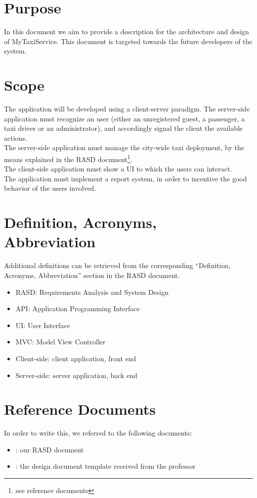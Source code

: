\section{Purpose}
In this document we aim to provide a description for the architecture and design of MyTaxiService.
This document is targeted towards the future developers of the system.

\section{Scope}
The application will be developed using a client-server paradigm.
The server-side application must recognize an user (either an unregistered guest, a passenger, a taxi driver or an administrator), 
and accordingly signal the client the available actions. \\
The server-side application must manage the city-wide taxi deployment, by the means explained in the RASD 
document\footnote{see reference documents}. \\ The client-side application must show a UI to which the users can interact. \\
The application must implement a report system, in order to incentive the good behavior of the users involved.

\section{Definition, Acronyms, Abbreviation}
Additional definitions can be retrieved from the corresponding ``Definition, Acronyms, Abbreviation'' section in the RASD document.
\begin{itemize}
 \item RASD: Requirements Analysis and System Design
 \item API: Application Programming Interface
 \item UI: User Interface
 \item MVC: Model View Controller
 \item Client-side: client application, front end
 \item Server-side: server application, back end
\end{itemize}

\section{Reference Documents}
In order to write this, we referred to the following documents:
\begin{itemize}
 \item [1]: our RASD document
 \item [2]: the design document template received from the professor
\end{itemize}

